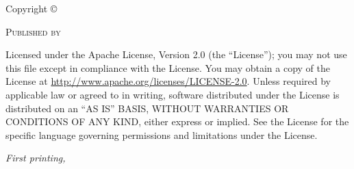 \newpage
\thispagestyle{empty} %

\begin{fullwidth}
\vspace*{110mm} %
\setlength{\parindent}{-7mm} %
\setlength{\parskip}{\baselineskip} %

\noindent
\par Copyright \copyright\ \the\year\ %

\par\textsc{Published by \publisher}

\par Licensed under the Apache License, Version 2.0 (the ``License''); you may not
use this file except in compliance with the License. You may obtain a copy
of the License at \url{http://www.apache.org/licenses/LICENSE-2.0}. Unless
required by applicable law or agreed to in writing, software distributed
under the License is distributed on an \textsc{``AS IS'' BASIS, WITHOUT
WARRANTIES OR CONDITIONS OF ANY KIND}, either express or implied. See the
License for the specific language governing permissions and limitations
under the License.

\par\textit{First printing, \monthyear}

\end{fullwidth}

